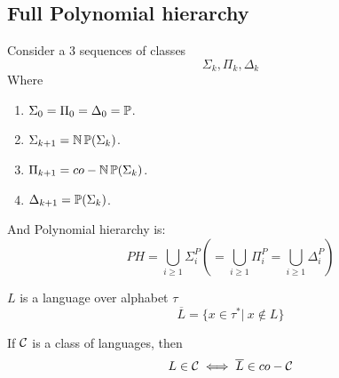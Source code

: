 \subsection{Full Polynomial hierarchy}

\begin{definition}
	Consider a 3 sequences of classes
	\[ \Sigma_k, \Pi_k, \Delta_k \]
	Where
	\begin{enumerate}
		\item $\Sigma_0 = \Pi_0 = \Delta_0 = \operatorname{\mathbb{P}}$.
		\item $\Sigma_{k + 1} = \operatorname{\operatorname{\mathbb{N}}\mathbb{P}}(\Sigma_k)$.
		\item $\Pi_{k + 1} = co-\operatorname{\operatorname{\mathbb{N}}\mathbb{P}}(\Sigma_k)$.
		\item $\Delta_{k + 1} = \operatorname{\mathbb{P}}(\Sigma_k)$.
	\end{enumerate}

	And Polynomial hierarchy is:
	\[ PH = \bigcup_{i \geq 1} \Sigma_i^P ( = \bigcup_{i \geq 1} \Pi_i^P = \bigcup_{i \geq 1} \Delta_i^P) \]

\end{definition}

\begin{definition}
	$L$ is a language over alphabet $\tau$
	\[ \overline{L} = \{ x \in \tau^{\ast} |\ x \notin L \} \]

	If $\operatorname{\mathcal{C}}$ is a class of languages, then
	\[ L \in \operatorname{\mathcal{C}} \iff \overline{L} \in co-\operatorname{\mathcal{C}} \]
\end{definition}

